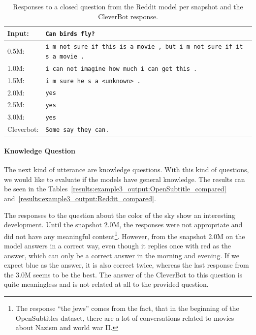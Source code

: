 \begin{table}[H]
	\centering
	\begin{adjustbox}{max width=\textwidth}
		\begin{tabularx}{\textwidth}{lX}
			\toprule
			Input: 	& \texttt{Can birds fly?}\\
			\midrule
			0.5M: 	& \texttt{i m not sure if this is a movie , but i m not sure if it s a movie .}\\
			1.0M: 	& \texttt{i can not imagine how much i can get this .}\\
			1.5M:	& \texttt{i m sure he s a <unknown> .}\\
			2.0M:	& \texttt{yes}\\
			2.5M:	& \texttt{yes}\\
			3.0M:	& \texttt{yes}\\
			Cleverbot:	& \texttt{Some say they can.}\\
			\bottomrule
		\end{tabularx}
	\end{adjustbox}
	\caption{Responses to a closed question from the Reddit model per snapshot and the CleverBot response.}
	\label{results:example2_output:Reddit_compared}
\end{table}

\paragraph{Knowledge Question}
The next kind of utterance are knowledge questions. With this kind of questions, we would like to evaluate if the models have general knowledge. The results can be seen in the Tables~\ref{results:example3_output:OpenSubtitle_compared} and~\ref{results:example3_output:Reddit_compared}.

The responses to the question about the color of the sky show an interesting development. Until the snapshot 2.0M, the responses were not appropriate and did not have any meaningful content\footnote{The response ``the jews'' comes from the fact, that in the beginning of the OpenSubtitles dataset, there are a lot of conversations related to movies about Nazism and world war II.}. However, from the snapshot 2.0M on the model answers in a correct way, even though it replies once with red as the answer, which can only be a correct answer in the morning and evening. If we expect blue as the answer, it is also correct twice, whereas the last response from the 3.0M seems to be the best. The answer of the CleverBot to this question is quite meaningless and is not related at all to the provided question.

